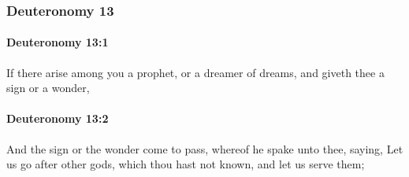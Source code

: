 	\subsubsection{Deuteronomy 13} %
		\label{DEUTERONOMY-13}

		\paragraph{Deuteronomy 13:1} %
			\label{DEUTERONOMY-13-1}

			If there arise among you a prophet, or a dreamer of dreams, and giveth thee a sign or a wonder,


		\paragraph{Deuteronomy 13:2} %
			\label{DEUTERONOMY-13-2}

			And the sign or the wonder come to pass, whereof he spake unto thee, saying, Let us go after other gods, which thou hast not known, and let us serve them;

